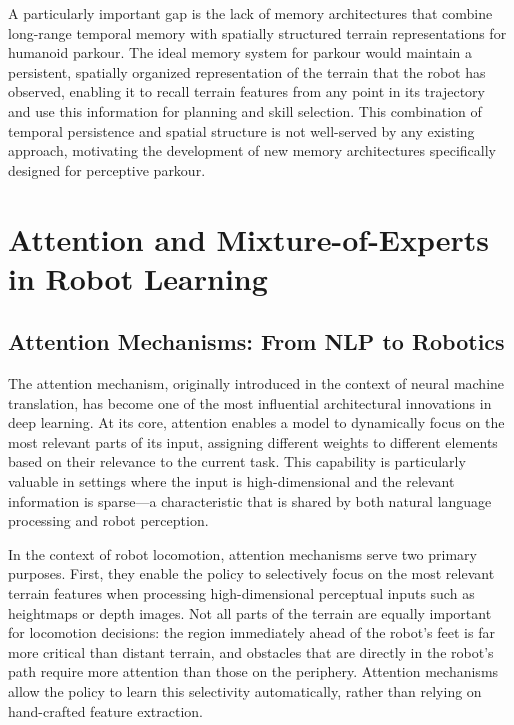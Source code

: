 A particularly important gap is the lack of memory architectures that combine long-range temporal memory with spatially structured terrain representations for humanoid parkour. The ideal memory system for parkour would maintain a persistent, spatially organized representation of the terrain that the robot has observed, enabling it to recall terrain features from any point in its trajectory and use this information for planning and skill selection. This combination of temporal persistence and spatial structure is not well-served by any existing approach, motivating the development of new memory architectures specifically designed for perceptive parkour.

\section{Attention and Mixture-of-Experts in Robot Learning}
\label{sec:rw_attention}

\subsection{Attention Mechanisms: From NLP to Robotics}

The attention mechanism, originally introduced in the context of neural machine translation, has become one of the most influential architectural innovations in deep learning. At its core, attention enables a model to dynamically focus on the most relevant parts of its input, assigning different weights to different elements based on their relevance to the current task. This capability is particularly valuable in settings where the input is high-dimensional and the relevant information is sparse---a characteristic that is shared by both natural language processing and robot perception.

In the context of robot locomotion, attention mechanisms serve two primary purposes. First, they enable the policy to selectively focus on the most relevant terrain features when processing high-dimensional perceptual inputs such as heightmaps or depth images. Not all parts of the terrain are equally important for locomotion decisions: the region immediately ahead of the robot's feet is far more critical than distant terrain, and obstacles that are directly in the robot's path require more attention than those on the periphery. Attention mechanisms allow the policy to learn this selectivity automatically, rather than relying on hand-crafted feature extraction.

